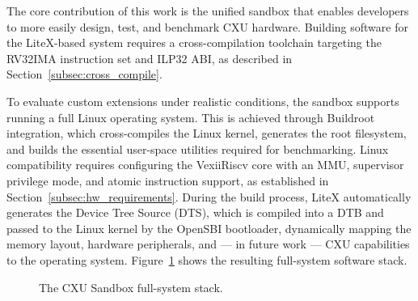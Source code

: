 The core contribution of this work is the unified sandbox that enables developers to
more easily design, test, and benchmark CXU hardware.
Building software for the LiteX-based system requires a cross-compilation toolchain
targeting the RV32IMA instruction set and ILP32 ABI, as described in
Section~\ref{subsec:cross_compile}.

To evaluate custom extensions under realistic conditions, the sandbox supports running
a full Linux operating system.
This is achieved through Buildroot integration, which cross-compiles the Linux kernel,
generates the root filesystem, and builds the essential user-space utilities required
for benchmarking.
Linux compatibility requires configuring the VexiiRiscv core with an MMU, supervisor
privilege mode, and atomic instruction support, as established in
Section~\ref{subsec:hw_requirements}.
During the build process, LiteX automatically generates the Device Tree Source (DTS),
which is compiled into a DTB and passed to the Linux kernel by the OpenSBI bootloader,
dynamically mapping the memory layout, hardware peripherals, and --- in future work ---
CXU capabilities to the operating system.
Figure~\ref{fig:cxu_stack} shows the resulting full-system software stack.

\begin{figure}[htb]
    \centering
    \caption{The CXU Sandbox full-system stack.}
    \label{fig:cxu_stack}
\end{figure}

